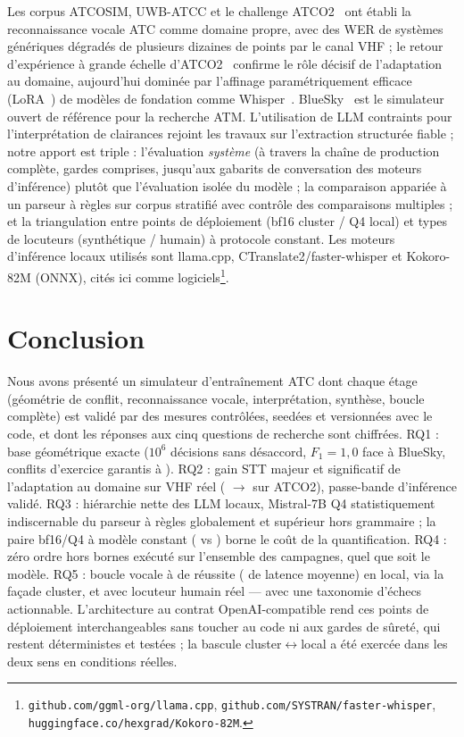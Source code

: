 \documentclass[10pt,a4paper]{article}
\newcommand{\syst}[1]{\texttt{#1}}
\begin{document}
Les corpus ATCOSIM, UWB-ATCC et le challenge ATCO2~\cite{atcosim,uwbatcc,
atco2} ont établi la reconnaissance vocale ATC comme domaine propre, avec
des WER de systèmes génériques dégradés de plusieurs dizaines de points par
le canal VHF ; le retour d'expérience à grande échelle
d'ATCO2~\cite{atco2lessons} confirme le rôle décisif de l'adaptation au
domaine, aujourd'hui dominée par l'affinage paramétriquement efficace
(LoRA~\cite{lora}) de modèles de fondation comme Whisper~\cite{whisper}.
BlueSky~\cite{bluesky} est le simulateur ouvert de référence pour la
recherche ATM. L'utilisation de LLM contraints pour l'interprétation de
clairances rejoint les travaux sur l'extraction structurée fiable ; notre
apport est triple : l'évaluation \emph{système} (à travers la chaîne de
production complète, gardes comprises, jusqu'aux gabarits de conversation
des moteurs d'inférence) plutôt que l'évaluation isolée du modèle ; la
comparaison appariée à un parseur à règles sur corpus stratifié avec
contrôle des comparaisons multiples ; et la triangulation entre points de
déploiement (bf16 cluster / Q4 local) et types de locuteurs (synthétique /
humain) à protocole constant. Les moteurs d'inférence locaux utilisés sont
llama.cpp, CTranslate2/faster-whisper et Kokoro-82M (ONNX), cités ici comme
logiciels\footnote{\syst{github.com/ggml-org/llama.cpp},
\syst{github.com/SYSTRAN/faster-whisper},
\syst{huggingface.co/hexgrad/Kokoro-82M}.}.

\section{Conclusion}

Nous avons présenté un simulateur d'entraînement ATC dont chaque étage
(géométrie de conflit, reconnaissance vocale, interprétation, synthèse,
boucle complète) est validé par des mesures contrôlées, seedées et
versionnées avec le code, et dont les réponses aux cinq questions de
recherche sont chiffrées. RQ1 : base géométrique exacte ($10^6$ décisions
sans désaccord, $F_1=1{,}0$ face à BlueSky, conflits d'exercice garantis à
\nConflitGarantie). RQ2 : gain STT majeur et significatif de l'adaptation
au domaine sur VHF réel (\nWERVanillaAtcoVhf{} $\rightarrow$
\nWERLoraAtcoVhf{} sur ATCO2), passe-bande d'inférence validé. RQ3 :
hiérarchie nette des LLM locaux, Mistral-7B Q4 statistiquement
indiscernable du parseur à règles globalement et supérieur hors grammaire ;
la paire bf16/Q4 à modèle constant (\nLLMRomeoAcc{} vs \nLLMBestAcc) borne
le coût de la quantification. RQ4 : zéro ordre hors bornes exécuté sur
l'ensemble des campagnes, quel que soit le modèle. RQ5 : boucle vocale à
\nEEVoix{} de réussite (\nEELatMoy{} de latence moyenne) en local,
\nEERomeoVoix{} via la façade cluster, et \nHumMicro{} avec locuteur humain
réel --- avec une taxonomie d'échecs actionnable. L'architecture au contrat
OpenAI-compatible rend ces points de déploiement interchangeables sans
toucher au code ni aux gardes de sûreté, qui restent déterministes et
testées ; la bascule cluster$\leftrightarrow$local a été exercée dans les
deux sens en conditions réelles.
\end{document}
